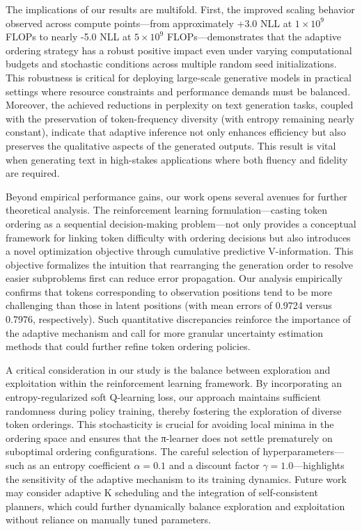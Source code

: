 \documentclass{article}
\begin{document}
\par The implications of our results are multifold. First, the improved scaling behavior observed across compute points—from approximately +3.0 NLL at \(1 \times 10^9\) FLOPs to nearly -5.0 NLL at \(5 \times 10^9\) FLOPs—demonstrates that the adaptive ordering strategy has a robust positive impact even under varying computational budgets and stochastic conditions across multiple random seed initializations. This robustness is critical for deploying large-scale generative models in practical settings where resource constraints and performance demands must be balanced. Moreover, the achieved reductions in perplexity on text generation tasks, coupled with the preservation of token-frequency diversity (with entropy remaining nearly constant), indicate that adaptive inference not only enhances efficiency but also preserves the qualitative aspects of the generated outputs. This result is vital when generating text in high-stakes applications where both fluency and fidelity are required.

\par Beyond empirical performance gains, our work opens several avenues for further theoretical analysis. The reinforcement learning formulation—casting token ordering as a sequential decision-making problem—not only provides a conceptual framework for linking token difficulty with ordering decisions but also introduces a novel optimization objective through cumulative predictive V-information. This objective formalizes the intuition that rearranging the generation order to resolve easier subproblems first can reduce error propagation. Our analysis empirically confirms that tokens corresponding to observation positions tend to be more challenging than those in latent positions (with mean errors of 0.9724 versus 0.7976, respectively). Such quantitative discrepancies reinforce the importance of the adaptive mechanism and call for more granular uncertainty estimation methods that could further refine token ordering policies.

\par A critical consideration in our study is the balance between exploration and exploitation within the reinforcement learning framework. By incorporating an entropy-regularized soft Q-learning loss, our approach maintains sufficient randomness during policy training, thereby fostering the exploration of diverse token orderings. This stochasticity is crucial for avoiding local minima in the ordering space and ensures that the π-learner does not settle prematurely on suboptimal ordering configurations. The careful selection of hyperparameters—such as an entropy coefficient \(\alpha=0.1\) and a discount factor \(\gamma=1.0\)—highlights the sensitivity of the adaptive mechanism to its training dynamics. Future work may consider adaptive K scheduling and the integration of self-consistent planners, which could further dynamically balance exploration and exploitation without reliance on manually tuned parameters.
\end{document}
